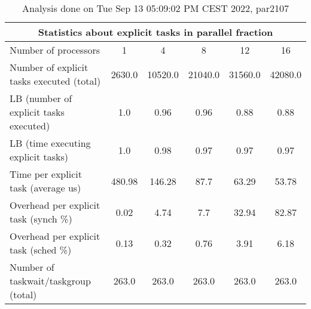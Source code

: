 \begin{table}[h]
\begin{center}
\begin{tabular}{|l|c|c|c|c|c|}
\hline
\multicolumn{6}{|c|}{Statistics about explicit tasks in parallel fraction} \\
\hline
\hline
Number of processors & 1 & 4 & 8 & 12 & 16 \\
\hline
\hline
Number of explicit tasks executed (total)        &          2630.0 &         10520.0 &         21040.0 &         31560.0 &         42080.0 \\
\hline
LB (number of explicit tasks executed)           &             1.0 &            0.96 &            0.96 &            0.88 &            0.88 \\
\hline
LB (time executing explicit tasks)               &             1.0 &            0.98 &            0.97 &            0.97 &            0.97 \\
\hline
Time per explicit task (average us)                 &          480.98 &          146.28 &            87.7 &           63.29 &           53.78 \\
\hline
Overhead per explicit task (synch \%)             &            0.02 &            4.74 &             7.7 &           32.94 &           82.87 \\
\hline
Overhead per explicit task (sched \%)             &            0.13 &            0.32 &            0.76 &            3.91 &            6.18 \\
\hline
Number of taskwait/taskgroup (total)             &           263.0 &           263.0 &           263.0 &           263.0 &           263.0 \\
\hline
\end{tabular}
\end{center}
\caption{ Analysis done on Tue Sep 13 05:09:02 PM CEST 2022, par2107}
\end{table}
